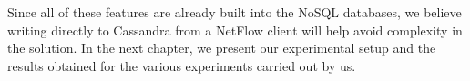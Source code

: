    Since all of these features are already built into the NoSQL databases, we believe writing directly to Cassandra from a NetFlow client will help avoid complexity in the solution. In the next chapter, we present our experimental setup and the results obtained for the various experiments carried out by us.
   

	